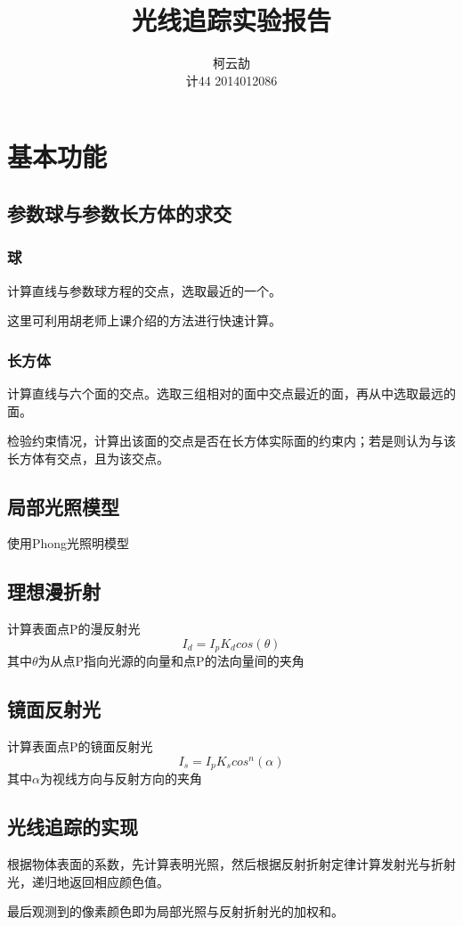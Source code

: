 \documentclass[12pt, a4paper, UTF8]{article}
\title{光线追踪实验报告}
\author{柯云劼\\计44 2014012086}
\begin{document}
\maketitle
\section{基本功能}

\subsection{参数球与参数长方体的求交}
\subsubsection{球}
计算直线与参数球方程的交点，选取最近的一个。\par
这里可利用胡老师上课介绍的方法进行快速计算。\par
\subsubsection{长方体}
计算直线与六个面的交点。选取三组相对的面中交点最近的面，再从中选取最远的面。\par
检验约束情况，计算出该面的交点是否在长方体实际面的约束内；若是则认为与该长方体有交点，且为该交点。\par
\subsection{局部光照模型}
使用Phong光照明模型
\subsection{理想漫折射}
计算表面点P的漫反射光
$$I_d = I_pK_dcos(\theta)$$
其中$\theta$为从点P指向光源的向量和点P的法向量间的夹角
\subsection{镜面反射光}
计算表面点P的镜面反射光
$$I_s = I_pK_scos^n(\alpha)$$
其中$\alpha$为视线方向与反射方向的夹角

\subsection{光线追踪的实现}
根据物体表面的系数，先计算表明光照，然后根据反射折射定律计算发射光与折射光，递归地返回相应颜色值。\par
最后观测到的像素颜色即为局部光照与反射折射光的加权和。
\end{document}
